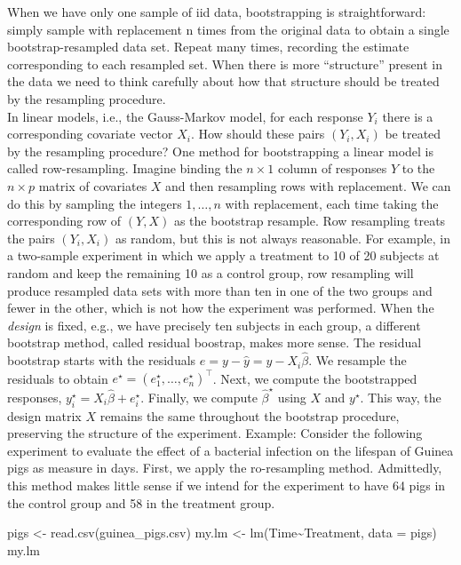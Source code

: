 \documentclass[
]{book}
\newenvironment{Shaded}{\begin{snugshade}}{\end{snugshade}}
\newcommand{\AttributeTok}[1]{\textcolor[rgb]{0.77,0.63,0.00}{#1}}
\newcommand{\FunctionTok}[1]{\textcolor[rgb]{0.00,0.00,0.00}{#1}}
\newcommand{\NormalTok}[1]{#1}
\newcommand{\OtherTok}[1]{\textcolor[rgb]{0.56,0.35,0.01}{#1}}
\newcommand{\SpecialCharTok}[1]{\textcolor[rgb]{0.00,0.00,0.00}{#1}}
\newcommand{\StringTok}[1]{\textcolor[rgb]{0.31,0.60,0.02}{#1}}
\begin{document}
When we have only one sample of iid data, bootstrapping is straightforward: simply sample with replacement n times from the original data to obtain a single bootstrap-resampled data set. Repeat many times, recording the estimate corresponding to each resampled set. When there is more ``structure'' present in the data we need to think carefully about how that structure should be treated by the resampling procedure.\\
In linear models, i.e., the Gauss-Markov model, for each response \(Y_i\) there is a corresponding covariate vector \(X_i\). How should these pairs \((Y_i, X_i)\) be treated by the resampling procedure?
One method for bootstrapping a linear model is called row-resampling. Imagine binding the \(n\times 1\) column of responses \(Y\) to the \(n\times p\) matrix of covariates \(X\) and then resampling rows with replacement. We can do this by sampling the integers \(1, \ldots, n\) with replacement, each time taking the corresponding row of \((Y, X)\) as the bootstrap resample. Row resampling treats the pairs \((Y_i, X_i)\) as random, but this is not always reasonable. For example, in a two-sample experiment in which we apply a treatment to 10 of 20 subjects at random and keep the remaining 10 as a control group, row resampling will produce resampled data sets with more than ten in one of the two groups and fewer in the other, which is not how the experiment was performed.
When the \emph{design} is fixed, e.g., we have precisely ten subjects in each group, a different bootstrap method, called residual boostrap, makes more sense. The residual bootstrap starts with the residuals \(e = y - \hat y = y - X_i\hat\beta\). We resample the residuals to obtain \(e^\star = (e_1^\star, \ldots, e_n^\star)^\top\). Next, we compute the bootstrapped responses, \(y_i^\star = X_i\hat\beta + e_i^\star\). Finally, we compute \(\hat\beta^\star\) using \(X\) and \(y^\star\). This way, the design matrix \(X\) remains the same throughout the bootstrap procedure, preserving the structure of the experiment.
Example: Consider the following experiment to evaluate the effect of a bacterial infection on the lifespan of Guinea pigs as measure in days. First, we apply the ro-resampling method. Admittedly, this method makes little sense if we intend for the experiment to have 64 pigs in the control group and 58 in the treatment group.

\begin{Shaded}
\begin{Highlighting}[]
\NormalTok{pigs }\OtherTok{\textless{}{-}} \FunctionTok{read.csv}\NormalTok{(}\StringTok{\textquotesingle{}guinea\_pigs.csv\textquotesingle{}}\NormalTok{)}
\NormalTok{my.lm }\OtherTok{\textless{}{-}} \FunctionTok{lm}\NormalTok{(Time}\SpecialCharTok{\textasciitilde{}}\NormalTok{Treatment, }\AttributeTok{data =}\NormalTok{ pigs)}
\NormalTok{my.lm}
\end{Highlighting}
\end{Shaded}
\end{document}

